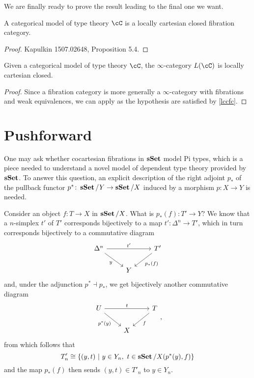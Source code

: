 \documentclass[a4paper,12pt]{scrartcl}
\begin{document}
We are finally ready to prove the result leading to the final one we want.

\begin{prop}\label{lccfc}
  A categorical model of type theory $\cC$ is a locally cartesian closed
  fibration category.
\end{prop}
\begin{proof}
  Kapulkin 1507.02648, Proposition 5.4.
\end{proof}

\begin{thm}
  Given a categorical model of type theory $\cC$, the $\infty$-category $L(\cC)$
  is locally cartesian closed.
\end{thm}
\begin{proof}
  Since a fibration category is more generally a $\infty$-category with
  fibrations and weak equivalences, we can apply \cite[Prop.\ 7.6.16]{Cis19} as
  the hypothesis are satisfied by \ref{lccfc}.
\end{proof}

\section{Pushforward}

One may ask whether cocartesian fibrations in $\operatorname{\mathbf{sSet}}$ model Pi types, which is a
piece needed to understand a novel model of dependent type theory provided by
$\operatorname{\mathbf{sSet}}$. To answer this question, an explicit description of the right adjoint
$p_*$ of the pullback functor $p^*\colon\operatorname{\mathbf{sSet}}/Y\rightarrow\operatorname{\mathbf{sSet}}/X$ induced by a
morphism $p\colon X\rightarrow Y$ is needed.

Consider an object $f\colon T\rightarrow X$ in $\operatorname{\mathbf{sSet}}/X$. What is $p_*(f)\colon
T'\rightarrow Y$? We know that a $n$-simplex $t'$ of $T'$ corresponds
bijectively to a map $t'\colon\Delta^n\rightarrow T'$, which in turn corresponds
bijectively to a commutative diagram
\[\begin{tikzcd}
	{\Delta^n} & {} & {T'} \\
	& Y
	\arrow["{t'}", from=1-1, to=1-3]
	\arrow["y"', from=1-1, to=2-2]
	\arrow["{p_*(f)}", from=1-3, to=2-2]
\end{tikzcd}\]
and, under the adjunction $p^*\dashv p_*$, we get bijectively another
commutative diagram
\[\begin{tikzcd}
	U & {} & T \\
	& X
	\arrow["t", from=1-1, to=1-3]
	\arrow["{p^*(y)}"', from=1-1, to=2-2]
	\arrow["f", from=1-3, to=2-2]
\end{tikzcd},\]
from which follows that
\[T'_n\cong\{(y,t)\ |\ y\in Y_n,\ t\in\sSet/X(p^*(y),f)\}\]
and the map $p_*(f)$ then sends $(y,t)\in T'_n$ to $y\in Y_n$.
\end{document}
